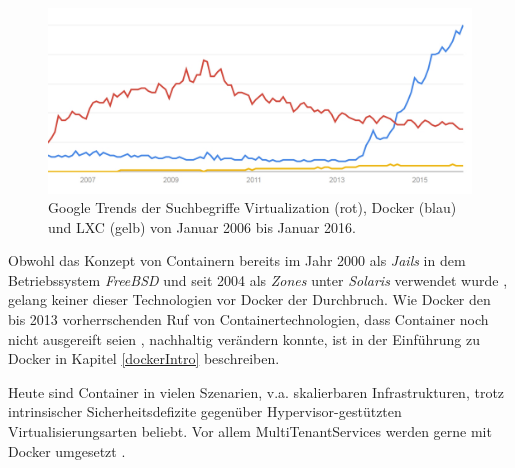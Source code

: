 \documentclass[../main.tex]{subfiles}
\begin{document}
  \begin{figure}[h]
      \centering
      \includegraphics[width=1.0\textwidth]{./images/googletrend_dockerVirtualizationLXC.jpg}
      \caption{Google Trends der Suchbegriffe \glqq{}Virtualization\grqq{} (rot), \glqq{}Docker\grqq{} (blau) und \glqq{}LXC\grqq{} (gelb) von Januar 2006 bis Januar 2016\cite{googleTrends}.}
      \label{fig:overview_googleTrends}
  \end{figure}

  Obwohl das Konzept von Containern bereits im Jahr 2000 als \emph{Jails} in dem Betriebssystem \emph{FreeBSD} und seit 2004 als \emph{Zones} unter \emph{Solaris} verwendet wurde \cite{zonesReleasenotes}\cite{jailsReleasenotes}, gelang keiner dieser Technologien vor Docker der Durchbruch. Wie Docker den bis 2013 vorherrschenden Ruf von Containertechnologien, dass Container noch nicht ausgereift seien \cite[S.8]{containerVirtPerformance}, nachhaltig verändern konnte, ist in der Einführung zu Docker in Kapitel \ref{dockerIntro} beschreiben.

  Heute sind Container in vielen Szenarien, v.a. skalierbaren Infrastrukturen, trotz intrinsischer Sicherheitsdefizite gegenüber Hypervisor-gestützten Virtualisierungsarten beliebt. Vor allem \glspl{MultiTenantService} werden gerne mit Docker umgesetzt \cite[S.6]{dockerBook}\cite{dockerUnderstandingDocker}.

\end{document}
